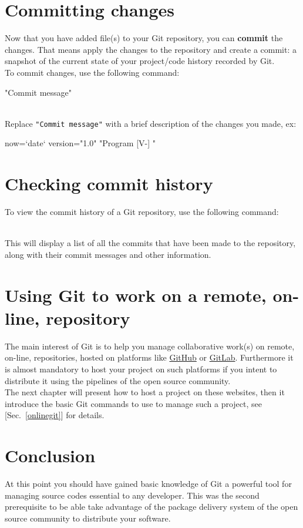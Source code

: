 \section{Committing changes}

Now that you have added file(s) to your Git repository, you can {\bf{commit}} the changes. 
That means apply the changes to the repository and create a commit: a snapshot of the current state of your project/code history recorded by Git. \\
To commit changes, use the following command:
\begin{script}
    "Commit message"
\end{script}
\\[-0.25cm]
\noindent Replace \texttt{"Commit message"} with a brief description of the changes you made, ex:
\begin{script}
 now=`date`
 version="1.0"
     "Program [V-] "
\end{script}

\section{Checking commit history}

To view the commit history of a Git repository, use the following command:
\begin{script}
  
\end{script}
\\[-0.25cm]
\noindent This will display a list of all the commits that have been made to the repository, 
along with their commit messages and other information.

\section{Using Git to work on a remote, on-line, repository}

The main interest of Git is to help you manage collaborative work(s) on remote, on-line, repositories, hosted on platforms like \href{https://github.com}{GitHub} or \href{https://gitlab.com}{GitLab}. 
Furthermore it is almost mandatory to host your project on such platforms if you intent to distribute it using the pipelines of the open source community. \\
The next chapter will present how to host a project on these websites, then it introduce the basic Git commands to use to manage such a project, see [Sec.~\ref{onlinegit}] for details. 

\section{Conclusion}

At this point you should have gained basic knowledge of Git a powerful tool for managing source codes essential to any developer. 
This was the second prerequisite to be able take advantage of the package delivery system of the open source community to distribute your software.

